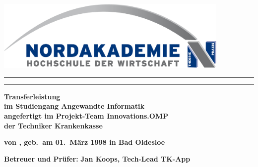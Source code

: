 
\thispagestyle{empty}
\begin{center}
\vspace*{-2cm}
\includegraphics[width=0.85\textwidth]{Bilder/Logo_NAK}\\
\vspace*{1.5cm}
{
    \huge
    \onehalfspacing{}
    \color[RGB]{91,155,213}
    \noindent\rule{\textwidth}{0.4pt}
        \thetitle{}
    \vspace*{-3mm}
    \noindent\vspace*{-3mm}\rule{\textwidth}{0.4pt}
    \par
}
\vfill
{
    \normalfont\normalcolor\bfseries\large
    Transferleistung \\
    \large
    im Studiengang Angewandte Informatik\\
    angefertigt im Projekt-Team Innovations.OMP\\
    der Techniker Krankenkasse\\
    \par
}
\end{center}\par
\vspace*{2.5cm}
\noindent\begin{minipage}[b]{\textwidth}
{
  \noindent \textbf{von \theauthor, geb.~am 01.~März 1998 in Bad Oldesloe}\\

  \begin{tabbing}
  \textbf{Betreuer und Prüfer:}  \= \textbf{Jan Koops, Tech-Lead TK-App}
  \\
  \\
  \\
  \end{tabbing}

  \noindent\textbf{\theLocationAndDate}
}
\end{minipage}
